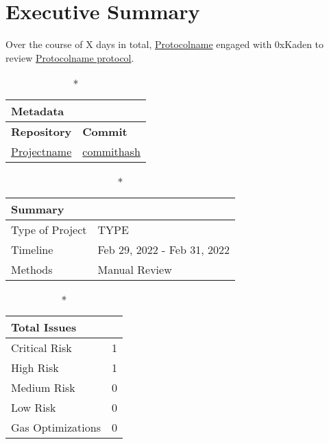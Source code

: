 \hypertarget{executive-summary}{%
\section{Executive Summary}\label{executive-summary}}

Over the course of X days in total, \href{https://protocolname.com}{Protocolname} engaged with
0xKaden to review
\href{https://github.com/permalink-to-protocolname}{Protocolname protocol}.

{\renewcommand{\arraystretch}{1.5}
\begin{longtable}[c]{|p{}|p{}|}
\caption*{\textbf{Metadata}} \\ %
\hline \textbf{Repository} & \textbf{Commit} \\ \hline
\href{https://github.com/permalink}{Projectname} &
\href{https://github.com/permalink/commit/commithash}{commithash} \\
\hline
\end{longtable}
}

{\renewcommand{\arraystretch}{1.5}
\begin{longtable}[]{|p{}|p{}|}

\caption*{\textbf{Summary}} \\ %
\hline Type of Project & TYPE \\   %
\hline Timeline & Feb 29, 2022 - Feb 31, 2022   \\
\hline Methods & Manual Review \\
\hline
\end{longtable}
}

{\renewcommand{\arraystretch}{1.5}
\begin{longtable}[]{|p{}|p{}|}
\caption*{\textbf{Total Issues}} \\ %
\hline Critical Risk & 1 \\ %
\hline High Risk & 1 \\
\hline Medium Risk & 0 \\ 
\hline Low Risk & 0 \\
\hline Gas Optimizations & 0 \\
\hline
\end{longtable}
}
